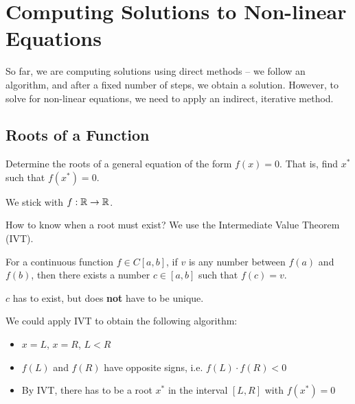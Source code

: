 \chapter{Computing Solutions to Non-linear Equations}

So far, we are computing solutions using direct methods -- we follow an algorithm, and after a fixed number of steps, we obtain a solution. However, to solve for non-linear equations, we need to apply an indirect, iterative method.

\section{Roots of a Function}

Determine the roots of a general equation of the form \( f(x) = 0 \). That is, find \( x^\ast \) such that \( f(x^\ast) = 0 \).

\begin{note}
    We stick with \( f: \mathbb{R} \to \mathbb{R} \).
\end{note}

How to know when a root must exist? We use the Intermediate Value Theorem (IVT).

\begin{theorem}
    For a continuous function \( f \in C[a, b] \), if \( v \) is any number between \( f(a) \) and \( f(b) \), then there exists a number \( c \in [a, b] \) such that \( f(c) = v \).
\end{theorem}

\begin{remark}
    \( c \) has to exist, but does \textbf{not} have to be unique.
\end{remark}

We could apply IVT to obtain the following algorithm:
\begin{itemize}
    \item \( x = L \), \( x = R \), \( L < R \)
    \item \( f(L) \) and \( f(R) \) have opposite signs, i.e. \( f(L) \cdot f(R) < 0 \)
    \item By IVT, there has to be a root \( x^\ast \) in the interval \( [L, R] \) with \( f(x^\ast) = 0 \)
\end{itemize}

